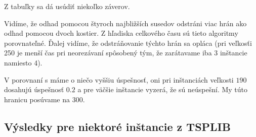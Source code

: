 Z tabuľky sa dá usúdiť niekoľko záverov.

Vidíme, že odhad pomocou štyroch najbližších susedov
odstráni viac hrán ako odhad pomocou dvoch kostier. Z hľadiska celkového času sú tieto algoritmy
porovnateľné. Ďalej vidíme, že odstráňovanie týchto hrán sa opláca (pri veľkosťi 250 je menší
čas pri neorezávaní spôsobený tým, že zarátavame iba 3 inštancie namiesto 4).

V porovnaní s \cite{duchenne} máme o niečo vyššiu úspešnosť, oni pri inštanciách
veľkosti $190$ dosahujú úspešnosť $0.2$ a pre väčšie inštancie vyzerá, že sú neúspešní.
My túto hranicu posúvame na $300$.

\subsection{Výsledky pre niektoré inštancie z TSPLIB}


